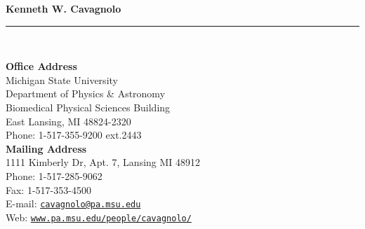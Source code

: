 \documentclass[11pt]{cv}
\begin{document}

\begin{center}
{\large \textbf{\sc Kenneth W. Cavagnolo}}\\
\rule{17.35cm}{1pt}\\
\end{center}
\normalsize

\addresses
{
{\bf Office Address}\\
Michigan State University\\
Department of Physics \& Astronomy\\
Biomedical Physical Sciences Building\\
East Lansing, MI 48824-2320\\
Phone: 1-517-355-9200 ext.2443\\
}
{
{\bf Mailing Address}\\
1111 Kimberly Dr, Apt. 7, Lansing MI 48912\\
Phone: 1-517-285-9062\\
Fax: 1-517-353-4500\\
E-mail: \href{mailto:cavagnolo@pa.msu.edu}{\tt cavagnolo@pa.msu.edu}\\
Web: \href{http://www.pa.msu.edu/people/cavagnolo/}{\tt www.pa.msu.edu/people/cavagnolo/}\\
}
\end{document}
